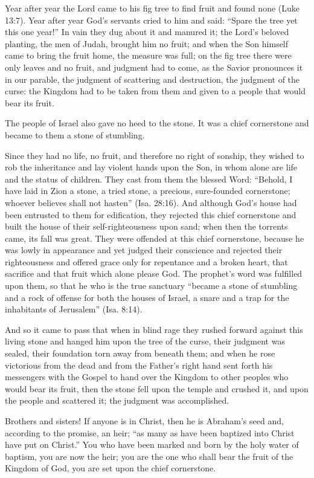 Year after year the Lord came to his fig tree to find fruit and found none (Luke 13:7). Year after year God’s servants cried to him and said: “Spare the tree yet this one year!” In vain they dug about it and manured it; the Lord’s beloved planting, the men of Judah, brought him no fruit; and when the Son himself came to bring the fruit home, the measure was full; on the fig tree there were only leaves and no fruit, and judgment had to come, as the Savior pronounces it in our parable, the judgment of scattering and destruction, the judgment of the curse: the Kingdom had to be taken from them and given to a people that would bear its fruit.

The people of Israel also gave no heed to the stone. It was a chief cornerstone and became to them a stone of stumbling.

Since they had no life, no fruit, and therefore no right of sonship, they wished to rob the inheritance and lay violent hands upon the Son, in whom alone are life and the status of children. They cast from them the blessed Word: “Behold, I have laid in Zion a stone, a tried stone, a precious, sure-founded cornerstone; whoever believes shall not hasten” (Isa. 28:16). And although God’s house had been entrusted to them for edification, they rejected this chief cornerstone and built the house of their self-righteousness upon sand; when then the torrents came, its fall was great. They were offended at this chief cornerstone, because he was lowly in appearance and yet judged their conscience and rejected their righteousness and offered grace only for repentance and a broken heart, that sacrifice and that fruit which alone please God. The prophet’s word was fulfilled upon them, so that he who is the true sanctuary “became a stone of stumbling and a rock of offense for both the houses of Israel, a snare and a trap for the inhabitants of Jerusalem” (Isa. 8:14).

And so it came to pass that when in blind rage they rushed forward against this living stone and hanged him upon the tree of the curse, their judgment was sealed, their foundation torn away from beneath them; and when he rose victorious from the dead and from the Father’s right hand sent forth his messengers with the Gospel to hand over the Kingdom to other peoples who would bear its fruit, then the stone fell upon the temple and crushed it, and upon the people and scattered it; the judgment was accomplished.

Brothers and sisters! If anyone is in Christ, then he is Abraham’s seed and, according to the promise, an heir; “as many as have been baptized into Christ have put on Christ.” You who have been marked and born by the holy water of baptism, you are now the heir; you are the one who shall bear the fruit of the Kingdom of God, you are set upon the chief cornerstone.

